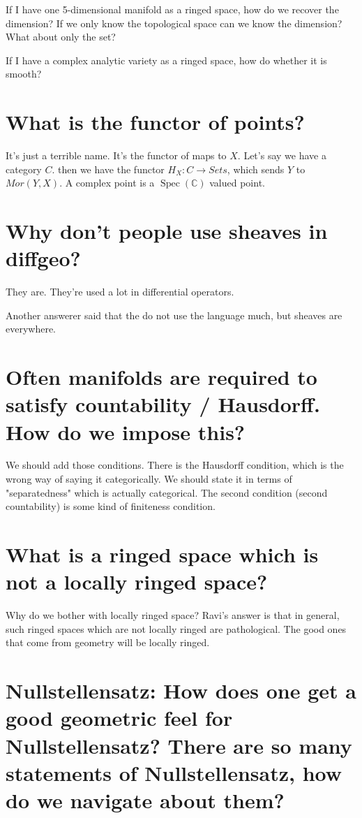 \documentclass{book}
\newcommand{\Spec}{\operatorname{Spec}}
\theoremstyle{definition}
\begin{document}
If I have one 5-dimensional manifold as a ringed space, how do we recover the
dimension? If we only know the topological space can we know the dimension?
What about only the set?

If I have a complex analytic variety as a ringed space, how do whether it is
smooth?

\section{What is the functor of points?}

It's just a terrible name. It's the functor of maps to $X$. Let's say we have
a category $C$. then we have the functor $H_X: C \rightarrow Sets$, which
sends $Y$ to $Mor(Y, X)$. A complex point is a $\Spec(\mathbb C)$ valued point.

\section{Why don't people use sheaves in diffgeo?}
They are. They're used a lot in differential operators.

Another answerer said that the do not use the language much, but sheaves are
everywhere.

\section{Often manifolds are required to satisfy countability / Hausdorff. How do we impose this?}
We should add those conditions. There is the Hausdorff condition, which is the wrong
way of saying it categorically. We should state it in terms of "separatedness" which
is actually categorical. The second condition (second countability) is some kind
of finiteness condition.

\section{What is a ringed space which is not a locally ringed space?}
Why do we bother with locally ringed space? Ravi's answer is that in general,
such ringed spaces which are not locally ringed are pathological. The good ones
that come from geometry will be locally ringed.

\section{Nullstellensatz: How does one get a good geometric feel for Nullstellensatz? There are so many statements of Nullstellensatz,
how do we navigate about them?}
\end{document}
